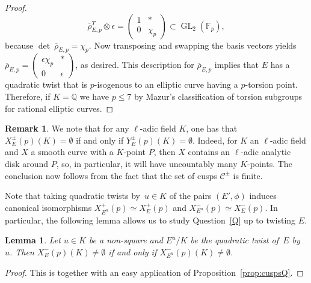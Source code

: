 \documentclass[12pt]{amsart}
\numberwithin{equation}{section}
\newtheorem{lemma}[equation]{Lemma}
\theoremstyle{definition}
\newtheorem{remark}[equation]{Remark}
\newcommand{\F}{\mathbb{F}}
\newcommand{\Q}{\mathbb{Q}}
\newcommand{\rhobar}{{\overline{\rho}}}
\DeclareMathOperator{\GL}{GL}
\newcommand{\cC}{\mathcal{C}}
\begin{document}
\begin{proof}
$$\rhobar_{E,p}^T \otimes \epsilon =
			\begin{pmatrix}
				1 & * \\
				0 & \chi_p
			\end{pmatrix} \subset \GL_2(\F_p),$$
because $\det\: \rhobar_{E,p} = \chi_p$. 
Now transposing and swapping the basis vectors yields $\rhobar_{E,p} =
			\left(\begin{smallmatrix}
				\epsilon \chi_p & * \\
				0 & \epsilon
			\end{smallmatrix} \right)$, as desired.
This description for $\rhobar_{E,p}$ implies that $E$ has a quadratic twist that is $p$-isogenous to an elliptic curve
having a $p$-torsion point. Therefore, if $K=\Q$ we have $p\leq 7$ by Mazur's classification of torsion subgroups for rational elliptic curves.
\end{proof}

\begin{remark}\label{rem:infinitepoints}
    We note that for any $\ell$-adic field $K$, one has that $X_E^\pm(p)(K)=\emptyset$ if and only if $Y_E^\pm(p)(K)=\emptyset$. Indeed, for $K$ an $\ell$-adic field and $X$ a smooth curve with a $K$-point $P$, then $X$ contains an $\ell$-adic analytic disk around $P$, so, in particular, it will have uncountably many $K$-points. The conclusion now follows from the fact that the set of cusps $\cC^\pm$ is finite.
\end{remark}

Note that taking quadratic twists by~$u \in K$ of the pairs $(E', \phi)$
induces canonical isomorphisms $X^+_{E^{u}}(p) \simeq X^+_E(p)$ and
$X^-_{E^{u}}(p) \simeq X^-_E(p)$. In particular, the following lemma allows us to study Question~\ref{Q} up to twisting $E$.

\begin{lemma}\label{lem:qtwists}
Let $u \in K$ be a non-square and $E^{u} / K$ be the quadratic twist of~$E$ by~$u$.
Then $X_E^{-}(p)(K)\neq \emptyset$ if and only if $X_{E^{u}}^{-}(p)(K) \neq \emptyset$.
 \end{lemma}
 \begin{proof} This is \cite[Lemma~11]{symplectic} together with an easy application of Proposition~\ref{prop:cuspsQ}.
  \end{proof}
\end{document}
